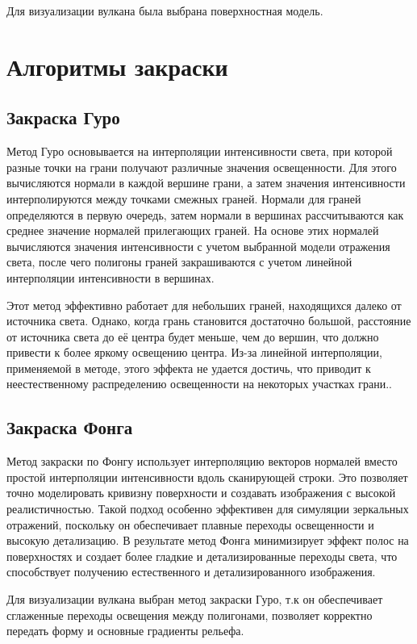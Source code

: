 Для визуализации вулкана была выбрана поверхностная модель.

\section{Алгоритмы закраски}

\subsection{Закраска Гуро}
Метод Гуро основывается на интерполяции интенсивности света, при которой разные точки на грани получают различные значения освещенности. Для этого вычисляются нормали в каждой вершине грани, а затем значения интенсивности интерполируются между точками смежных граней. Нормали для граней определяются в первую очередь, затем нормали в вершинах рассчитываются как среднее значение нормалей прилегающих граней. На основе этих нормалей вычисляются значения интенсивности с учетом выбранной модели отражения света, после чего полигоны граней закрашиваются с учетом линейной интерполяции интенсивности в вершинах.

Этот метод эффективно работает для небольших граней, находящихся далеко от источника света. Однако, когда грань становится достаточно большой, расстояние от источника света до её центра будет меньше, чем до вершин, что должно привести к более яркому освещению центра. Из-за линейной интерполяции, применяемой в методе, этого эффекта не удается достичь, что приводит к неестественному распределению освещенности на некоторых участках грани.\cite{lit2}.

\subsection{Закраска Фонга}
Метод закраски по Фонгу использует интерполяцию векторов нормалей вместо простой интерполяции интенсивности вдоль сканирующей строки. Это позволяет точно моделировать кривизну поверхности и создавать изображения с высокой реалистичностью. Такой подход особенно эффективен для симуляции зеркальных отражений, поскольку он обеспечивает плавные переходы освещенности и высокую детализацию. В результате метод Фонга минимизирует эффект полос на поверхностях и создает более гладкие и детализированные переходы света, что способствует получению естественного и детализированного изображения.

Для визуализации вулкана выбран метод закраски Гуро, т.к он обеспечивает сглаженные переходы освещения между полигонами, позволяет корректно передать форму и основные градиенты рельефа.
 
